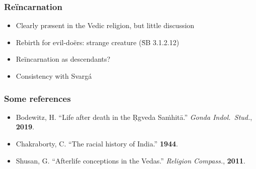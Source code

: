 \documentclass[pdf]{beamer}
\begin{document}
\begin{frame} \frametitle{Reïncarnation}
\begin{itemize}
	\item Clearly præsent in the Vedic religion, but little discussion
	\item Rebirth for evil-doërs: strange creature (ṠB 3.1.2.12)
	\item Reïncarnation as descendants?
	\item Consistency with Svargá
\end{itemize}
\end{frame}

\begin{frame} \frametitle{Some references}
\begin{itemize}
	\item Bodewitz, H. ``Life after death in the Ṛgveda Saṁhitā.'' \textit{Gonda Indol.~Stud.}, \textbf{2019}.
	\item Chakraborty, C. ``The racial history of India.'' \textbf{1944}.
	\item Shusan, G. ``Afterlife conceptions in the Vedas.'' \textit{Religion Compass.}, \textbf{2011}.
\end{itemize}
\end{frame}


\end{document}
